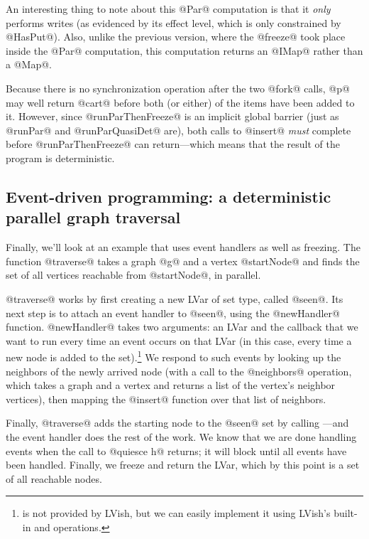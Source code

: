 \singlespacing

\doublespacing

An interesting thing to note about this @Par@ computation is that it
\emph{only} performs writes (as evidenced by its effect level, which
is only constrained by @HasPut@).  Also, unlike the previous version,
where the @freeze@ took place inside the @Par@ computation, this
computation returns an @IMap@ rather than a @Map@.

Because there is no synchronization operation after the two @fork@
calls, @p@ may well return @cart@ before both (or either) of the items
have been added to it.  However, since @runParThenFreeze@ is an
implicit global barrier (just as @runPar@ and @runParQuasiDet@ are),
both calls to @insert@ \emph{must} complete before @runParThenFreeze@
can return---which means that the result of the program is
deterministic.

\subsection{Event-driven programming: a deterministic parallel graph traversal}

Finally, we'll look at an example that uses event handlers as well as
freezing.  The function @traverse@ takes a graph @g@ and a vertex
@startNode@ and finds the set of all vertices reachable from
@startNode@, in parallel.

\singlespacing

\doublespacing

@traverse@ works by first creating a new LVar of set type, called
@seen@.  Its next step is to attach an event handler to @seen@, using
the @newHandler@ function.  @newHandler@ takes two arguments: an LVar
and the callback that we want to run every time an event occurs on
that LVar (in this case, every time a new node is added to the
set).\footnote{ is not provided by LVish, but we can
  easily implement it using LVish's built-in  and
   operations.}
We respond to such events by looking up the neighbors of the newly
arrived node (with a call to the @neighbors@ operation, which takes a
graph and a vertex and returns a list of the vertex's neighbor
vertices), then mapping the @insert@ function over that list of
neighbors.

Finally, @traverse@ adds the starting node to the @seen@ set by
calling ---and the event handler does the
rest of the work.  We know that we are done handling events when the
call to @quiesce h@ returns; it will block until all events have been
handled.  Finally, we freeze and return the LVar, which by this point
is a set of all reachable nodes.

